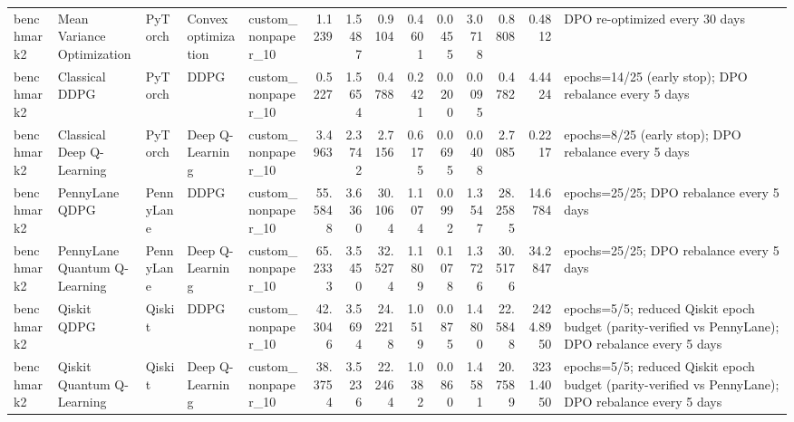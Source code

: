 \begin{tabular}{lllllrrrrrrrrl}
benchmark2 & Mean Variance Optimization & PyTorch & Convex optimization & custom_nonpaper_10 & 1.1239 & 1.5487 & 0.9104 & 0.4601 & 0.0455 & 3.0718 & 0.8808 & 0.4812 & DPO re-optimized every 30 days \\
benchmark2 & Classical DDPG & PyTorch & DDPG & custom_nonpaper_10 & 0.5227 & 1.5654 & 0.4788 & 0.2421 & 0.0200 & 0.0095 & 0.4782 & 4.4424 & epochs=14/25 (early stop); DPO rebalance every 5 days \\
benchmark2 & Classical Deep Q-Learning & PyTorch & Deep Q-Learning & custom_nonpaper_10 & 3.4963 & 2.3742 & 2.7156 & 0.6175 & 0.0695 & 0.0408 & 2.7085 & 0.2217 & epochs=8/25 (early stop); DPO rebalance every 5 days \\
benchmark2 & PennyLane QDPG & PennyLane & DDPG & custom_nonpaper_10 & 55.5848 & 3.6360 & 30.1064 & 1.1074 & 0.0992 & 1.3547 & 28.2585 & 14.6784 & epochs=25/25; DPO rebalance every 5 days \\
benchmark2 & PennyLane Quantum Q-Learning & PennyLane & Deep Q-Learning & custom_nonpaper_10 & 65.2333 & 3.5450 & 32.5274 & 1.1809 & 0.1078 & 1.3726 & 30.5176 & 34.2847 & epochs=25/25; DPO rebalance every 5 days \\
benchmark2 & Qiskit QDPG & Qiskit & DDPG & custom_nonpaper_10 & 42.3046 & 3.5694 & 24.2218 & 1.0519 & 0.0875 & 1.4800 & 22.5848 & 2424.8950 & epochs=5/5; reduced Qiskit epoch budget (parity-verified vs PennyLane); DPO rebalance every 5 days \\
benchmark2 & Qiskit Quantum Q-Learning & Qiskit & Deep Q-Learning & custom_nonpaper_10 & 38.3754 & 3.5236 & 22.2464 & 1.0382 & 0.0860 & 1.4581 & 20.7589 & 3231.4050 & epochs=5/5; reduced Qiskit epoch budget (parity-verified vs PennyLane); DPO rebalance every 5 days \\
\bottomrule
\end{tabular}
